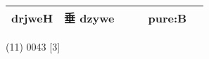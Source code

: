 \documentclass[14pt,a4paper]{scrartcl}
\begin{document}
\begin{longtable}[c]{@{}llllll@{}}
\begin{minipage}[t]{0.14\columnwidth}\raggedright\strut
drjweH
\strut\end{minipage} &
\begin{minipage}[t]{0.14\columnwidth}\raggedright\strut
垂 dzywe
\strut\end{minipage} &
\begin{minipage}[t]{0.14\columnwidth}\raggedright\strut
\strut\end{minipage} &
\begin{minipage}[t]{0.14\columnwidth}\raggedright\strut
\strut\end{minipage} &
\begin{minipage}[t]{0.14\columnwidth}\raggedright\strut
pure:B
\strut\end{minipage}\tabularnewline
\bottomrule
\end{longtable}

(11) 0043 {[}3{]}
\end{document}

